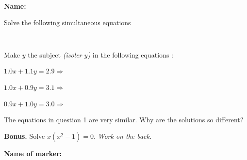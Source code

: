 \documentclass[12pt]{exam}
\begin{document}
\textbf{Name:} \dotfill

\begin{questions}


\question[6] Solve the following simultaneous equations


\

\question[3] Make $y$ the subject \emph{(isoler $y$)} in the following equations :
\vspace{2mm}

$1.0x + 1.1y = 2.9 \Rightarrow$ \dotfill

$1.0x + 0.9y = 3.1 \Rightarrow$ \dotfill 

$0.9x + 1.0y = 3.0 \Rightarrow$ \dotfill 

\question[1] The equations in question 1 are very similar. Why are the solutions so different?


\question[0] \textbf{Bonus.} Solve $x(x^2-1) = 0$. \hfill \emph{Work on the back.}

\end{questions}


\begin{tcolorbox}

\textbf{Name of marker:}

\begin{center}
\gradetable[h][questions]
\end{center}

\end{tcolorbox}
\end{document}
